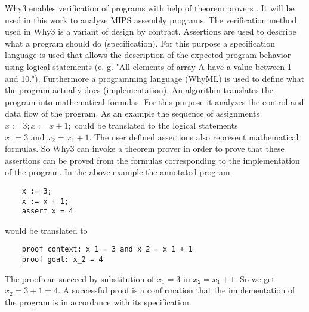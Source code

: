Why3 enables verification of programs with help of theorem provers \cite{wpmp}.
It will be used in this work to analyze MIPS assembly programs. The
verification method used in Why3 is a variant of design by contract.
Assertions are used to describe what a program should do (specification).
For this purpose a specification language is used that allows the 
description of the expected program behavior using logical statements
(e. g. "All elements of array A have a value between 1 and 10.").
Furthermore a programming language (WhyML) is used to define what the
program actually does (implementation). An algorithm translates the program into mathematical
formulas. For this purpose it analyzes the control and data flow of the program. As an example the 
sequence of assignments $x := 3; x := x + 1;$ could be translated to 
the logical statements $x_1 = 3 \text{ and } x_2 = x_1 + 1$. The user defined 
assertions also represent mathematical formulas. So Why3 can invoke a
theorem prover in order to prove that these assertions can be proved
from the formulas corresponding to the implementation of the program. In
the above example the annotated program
\begin{lstlisting}
    x := 3;
    x := x + 1;
    assert x = 4
\end{lstlisting}
would be translated to 
\begin{lstlisting}
    proof context: x_1 = 3 and x_2 = x_1 + 1
    proof goal: x_2 = 4
\end{lstlisting}
The proof can succeed by substitution of $x_1 = 3$ in $x_2 = x_1 + 1$.
So we get $x_2 = 3 + 1 = 4$.
A successful proof is a confirmation that the implementation of the 
program is in accordance with its specification.


